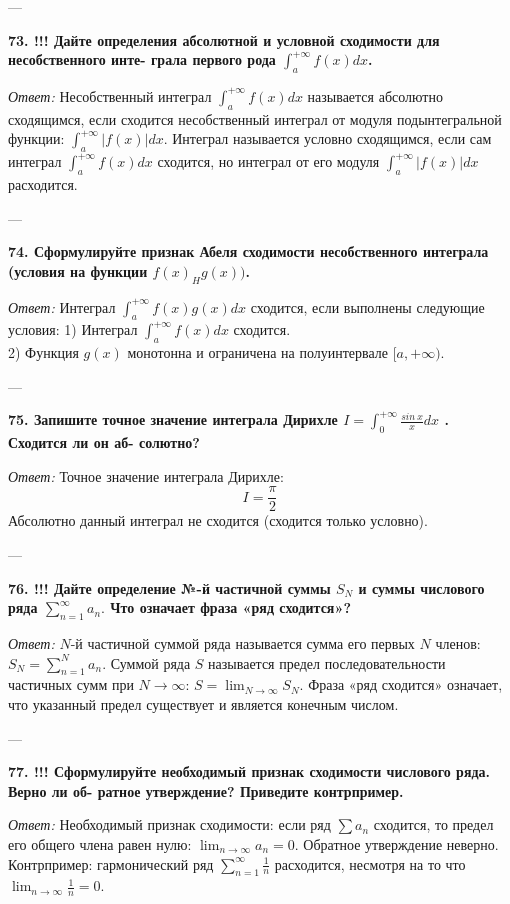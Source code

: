 \documentclass{article}
\begin{document}
---

\textbf{73. !!! Дайте определения абсолютной и условной сходимости для несобственного инте- грала первого рода $\int_{a}^{+\infty}f(x)dx$.}

\textit{Ответ:} Несобственный интеграл $\int_a^{+\infty} f(x) dx$ называется абсолютно сходящимся, если сходится несобственный интеграл от модуля подынтегральной функции: $\int_a^{+\infty} |f(x)| dx$. Интеграл называется условно сходящимся, если сам интеграл $\int_a^{+\infty} f(x) dx$ сходится, но интеграл от его модуля $\int_a^{+\infty} |f(x)| dx$ расходится.

---

\textbf{74. Сформулируйте признак Абеля сходимости несобственного интеграла (условия на функции $f(x)_{H}g(x))$.}

\textit{Ответ:} Интеграл $\int_a^{+\infty} f(x)g(x) dx$ сходится, если выполнены следующие условия:
1) Интеграл $\int_a^{+\infty} f(x) dx$ сходится. \\
2) Функция $g(x)$ монотонна и ограничена на полуинтервале $[a, +\infty)$.

---

\textbf{75. Запишите точное значение интеграла Дирихле $I=\int_{0}^{+\infty}\frac{sin~x}{x}dx$ . Сходится ли он аб- солютно?}

\textit{Ответ:} Точное значение интеграла Дирихле:
$$ I = \frac{\pi}{2} $$
Абсолютно данный интеграл не сходится (сходится только условно).

---

\textbf{76. !!! Дайте определение №-й частичной суммы $S_{N}$ и суммы числового ряда $\sum_{n=1}^{\infty}a_{n}.$ Что означает фраза «ряд сходится»?}

\textit{Ответ:} $N$-й частичной суммой ряда называется сумма его первых $N$ членов: $S_N = \sum_{n=1}^N a_n$. Суммой ряда $S$ называется предел последовательности частичных сумм при $N \to \infty$: $S = \lim_{N \to \infty} S_N$. Фраза «ряд сходится» означает, что указанный предел существует и является конечным числом.

---

\textbf{77. !!! Сформулируйте необходимый признак сходимости числового ряда. Верно ли об- ратное утверждение? Приведите контрпример.}

\textit{Ответ:} Необходимый признак сходимости: если ряд $\sum a_n$ сходится, то предел его общего члена равен нулю: $\lim_{n \to \infty} a_n = 0$. Обратное утверждение неверно. Контрпример: гармонический ряд $\sum_{n=1}^{\infty} \frac{1}{n}$ расходится, несмотря на то что $\lim_{n \to \infty} \frac{1}{n} = 0$.
\end{document}
